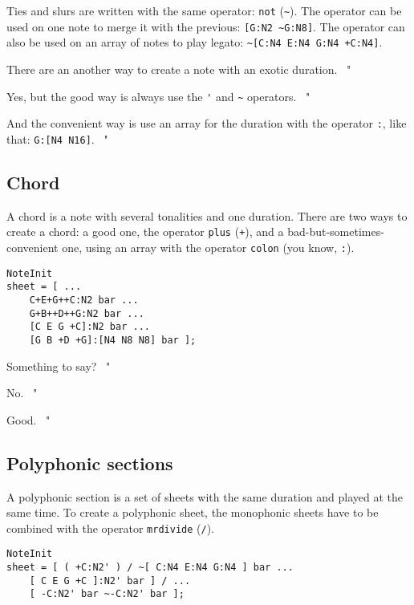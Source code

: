 \documentclass{article}
\newenvironment{meenv}{ \par \noindent \makebox[6em][r]{ \textcolor{mecolor}{Me}: " --~}}{~"}
\newenvironment{myselfenv}{ \par \noindent \makebox[6em][r]{ \textcolor{myselfcolor}{Myself}: " --~}}{~"}
\newcommand{ \me }[1]{%
\begin{meenv}%
	#1%
\end{meenv} }
\newcommand{ \myself }[1]{%
\begin{myselfenv}%
	#1%
\end{myselfenv} }
\begin{document}
Ties and slurs are written with the same operator: \lstinline!not! (\lstinline!~!). The operator can be used on one note to merge it with the previous: \lstinline![G:N2 ~G:N8]!. The operator can also be used on an array of notes to play legato: \lstinline!~[C:N4 E:N4 G:N4 +C:N4]!.

\me{There are an another way to create a note with an exotic duration.}
\begin{myselfenv}%
	Yes, but the good way is always use the \lstinline!'! and \lstinline!~! operators.%
\end{myselfenv}
\begin{meenv}%
	And the convenient way is use an array for the duration with the operator \lstinline!:!, like that: \lstinline!G:[N4 N16]!.%
\end{meenv}

\subsection{Chord}

A chord is a note with several tonalities and one duration. There are two ways to create a chord: a good one, the operator \lstinline!plus! (\lstinline!+!), and a bad-but-sometimes-convenient one, using an array with the operator \lstinline!colon! (you know, \lstinline!:!). \\

\begin{lstlisting}
NoteInit
sheet = [ ...
	C+E+G++C:N2 bar ...
	G+B++D++G:N2 bar ...
	[C E G +C]:N2 bar ...
	[G B +D +G]:[N4 N8 N8] bar ];
\end{lstlisting}

\myself{Something to say?}
\me{No.}
\myself{Good.}

\subsection{Polyphonic sections}

A polyphonic section is a set of sheets with the same duration and played at the same time. To create a polyphonic sheet, the monophonic sheets have to be combined with the operator \lstinline!mrdivide! (\lstinline!/!). \\
\begin{lstlisting}
NoteInit
sheet = [ ( +C:N2' ) / ~[ C:N4 E:N4 G:N4 ] bar ...
	[ C E G +C ]:N2' bar ] / ...
	[ -C:N2' bar ~-C:N2' bar ];
\end{lstlisting}
\end{document}
